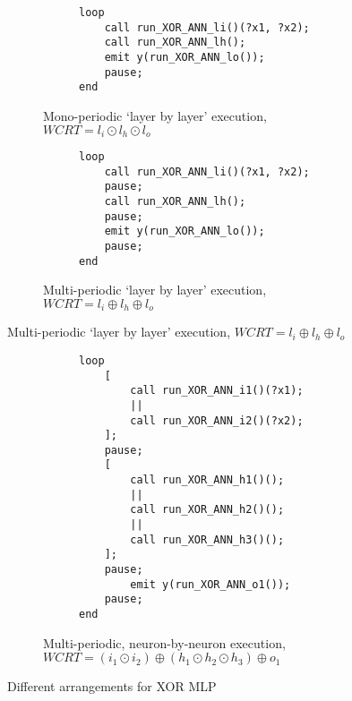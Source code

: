 \begin{figure}[h]
	\centering
\begin{subfigure}[h]{0.6\textwidth}
	\centering
	\begin{subfigure}[h]{0.3\textwidth}
		\centering
		
	\end{subfigure}%
	\begin{subfigure}[h]{0.66\textwidth}
		\vspace{3mm}
		\begin{lstlisting}
loop
	call run_XOR_ANN_li()(?x1, ?x2);
	call run_XOR_ANN_lh();
	emit y(run_XOR_ANN_lo());
	pause;
end
		\end{lstlisting}
	\end{subfigure}
	\caption{Mono-periodic `layer by layer' execution, $WCRT = l_i \odot l_h \odot l_o$}
	\label{fig:tca-bb}
\end{subfigure}

\vspace{5mm}
\begin{subfigure}[h]{0.5\textwidth}
	\centering
	\begin{subfigure}[h]{0.3\textwidth}
		\centering
		
	\end{subfigure}%
	\begin{subfigure}[h]{0.66\textwidth}
	\begin{lstlisting}
loop
	call run_XOR_ANN_li()(?x1, ?x2);
	pause;
	call run_XOR_ANN_lh();
	pause;
	emit y(run_XOR_ANN_lo());
	pause;
end
	\end{lstlisting}
	\end{subfigure}
	\caption{Multi-periodic `layer by layer' execution, $WCRT = l_i \oplus l_h \oplus l_o$}
	\label{fig:tca-layers}
\end{subfigure}
\end{figure}

\begin{figure}[h]
	\centering
\vspace{5mm}
\begin{subfigure}[h]{0.8\textwidth}
	\centering
	\begin{subfigure}[h]{0.3\textwidth}
		\centering
		
	\end{subfigure}%
	\begin{subfigure}[h]{0.66\textwidth}
		\begin{lstlisting}
loop
	[
		call run_XOR_ANN_i1()(?x1);
		|| 
		call run_XOR_ANN_i2()(?x2);
	];
	pause;
	[
		call run_XOR_ANN_h1()();
		||
		call run_XOR_ANN_h2()();
		||
		call run_XOR_ANN_h3()();
	];
	pause;
		emit y(run_XOR_ANN_o1());
	pause;
end
		\end{lstlisting}
	\end{subfigure}
	\caption{Multi-periodic, neuron-by-neuron execution, $WCRT = \left(i_1 \odot i_2\right) \oplus \left(h_1 \odot h_2 \odot h_3\right) \oplus o_1$}
	\label{fig:tca-neurons}
\end{subfigure}
\caption{Different arrangements for XOR \ac{MLP}}
\label{fig:tcas-xor}
\end{figure}